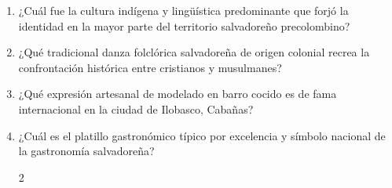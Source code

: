 \documentclass[10pt,a4paper]{article}
\begin{document}
\begin{enumerate}[label=\textbf{\arabic*.}]
\vspace{0.15cm}
\item ¿Cuál fue la cultura indígena y lingüística predominante que forjó la identidad en la mayor parte del territorio salvadoreño precolombino?
\begin{enumerate}[label=\textbf{\Alph*)}]
\end{enumerate}
\vspace{0.15cm}
\item ¿Qué tradicional danza folclórica salvadoreña de origen colonial recrea la confrontación histórica entre cristianos y musulmanes?
\begin{enumerate}[label=\textbf{\Alph*)}]
\end{enumerate}
\vspace{0.15cm}
\item ¿Qué expresión artesanal de modelado en barro cocido es de fama internacional en la ciudad de Ilobasco, Cabañas?
\begin{enumerate}[label=\textbf{\Alph*)}]
\end{enumerate}
\vspace{0.15cm}
\item ¿Cuál es el platillo gastronómico típico por excelencia y símbolo nacional de la gastronomía salvadoreña?
\begin{enumerate}[label=\textbf{\Alph*)}]
\begin{multicols}{2}

\end{multicols}
\end{enumerate}
\end{enumerate}
\end{document}
